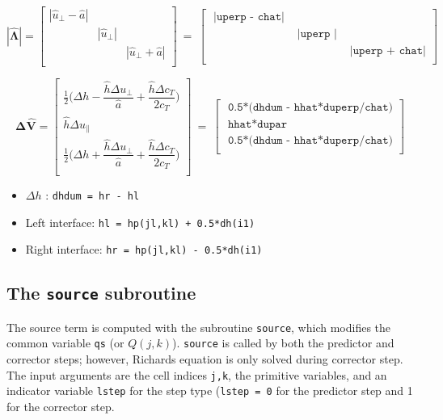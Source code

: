 \documentclass{article}
\newcommand{\code}[1]{\texttt{#1}}
\begin{document}
\
 
 \[ \mathbf{|\hat{\Lambda}|} = 
\begin{bmatrix}
  |\hat{u}_\perp - \hat a| &  &  \\
     &   |\hat{u}_\perp | &  \\ 
     & &  |\hat{u}_\perp  + \hat a| \\
\end{bmatrix} \ =  \
\begin{bmatrix}
 \code{ |uperp - chat|} &  &  \\
     &    \code{ |uperp |} &  \\ 
     & &   \code{ |uperp + chat|} \\
\end{bmatrix} 
\]


 \[ \mathbf{\Delta \hat{V}} = 
\begin{bmatrix}
	\frac{1}{2} \bigg( \Delta h - \dfrac{\hat h \Delta u_{\perp} }{\hat a} +
	 \dfrac{\hat h \Delta c_T }{2  c_T}\bigg) \\[.2cm]
      \hat h \Delta u_\parallel   \\[.2cm]
   	\frac{1}{2} \bigg( \Delta h + \dfrac{\hat h \Delta u_{\perp} }{\hat a} +
	 \dfrac{\hat h \Delta c_T }{2  c_T}\bigg) 
	 \\
\end{bmatrix} \ =  \ 
\begin{bmatrix}
 \code{ 0.5*(dhdum - hhat*duperp/chat)}  \\[.2cm]
 \code{ hhat*dupar}  \\[.2cm]
 \code{ 0.5*(dhdum - hhat*duperp/chat)}  \\
\end{bmatrix} 
\]

  \begin{itemize}
 	\item  $\Delta h$ : \code{dhdum = hr - hl } 
 	\item  Left interface:   \code{hl = hp(jl,kl) + 0.5*dh(i1)}
  	\item  Right interface:   \code{hr = hp(jl,kl) - 0.5*dh(i1)}
 \end{itemize}
 

\subsection{The \code{source} subroutine}

 The source term is computed with the subroutine \code{source}, which modifies the common variable \code{qs} (or $Q(j,k)$).
  \code{source} is called by both the predictor and corrector steps; however, Richards equation is only solved during corrector step. 
 The input arguments are the  cell indices \code{j,k}, the primitive variables, and an indicator variable \code{lstep} for the step type (\code{lstep = 0} for the predictor step and 1 for the corrector step.		
 
\end{document}
